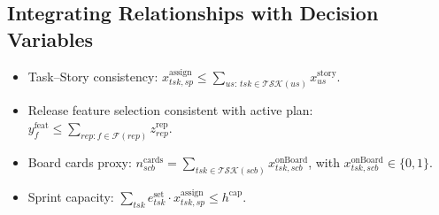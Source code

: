 \documentclass[11pt,a4paper]{article}
\begin{document}
\subsection*{Integrating Relationships with Decision Variables}
\begin{itemize}[leftmargin=2em]
  \item Task--Story consistency: $x^{\text{assign}}_{tsk,sp} \le \sum\limits_{us: \, tsk \in \mathcal{TSK}(us)} x^{\text{story}}_{us}$.
  \item Release feature selection consistent with active plan: $y^{\text{feat}}_{f} \le \sum\limits_{rep: f \in \mathcal{F}(rep)} z^{\text{rep}}_{rep}$.
  \item Board cards proxy: $n^{\text{cards}}_{scb} = \sum\limits_{tsk \in \mathcal{TSK}(scb)} x^{\text{onBoard}}_{tsk,scb}$, with $x^{\text{onBoard}}_{tsk,scb}\!\in\!\{0,1\}$.
  \item Sprint capacity: $\sum\limits_{tsk} e^{\text{set}}_{tsk} \cdot x^{\text{assign}}_{tsk,sp} \le h^{\text{cap}}$.
\end{itemize}
\end{document}
